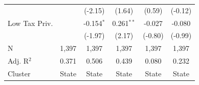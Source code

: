 \begin{tabular*}{\textwidth}{@{\extracolsep{\fill}}lccccc}
                        &                & (-2.15)       & (1.64)      & (0.59)  & (-0.12)\\   
   Low Tax Priv.        &                & -0.154$^{*}$   & 0.261$^{**}$ & -0.027   & -0.080\\   
                        &                & (-1.97)       & (2.17)      & (-0.80) & (-0.99)\\   
   \hline
   N         & 1,397          & 1,397          & 1,397        & 1,397    & 1,397\\  
   Adj. R$^2$       & 0.371          & 0.506          & 0.439        & 0.080    & 0.232\\  
   Cluster              & State & State & State & State & State\\  
   \bottomrule
\end{tabular*}
\par\endgroup
